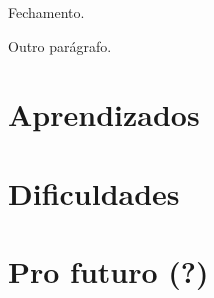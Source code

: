 
Fechamento.

Outro parágrafo.

\section{Aprendizados}
\section{Dificuldades}
\section{Pro futuro (?)}